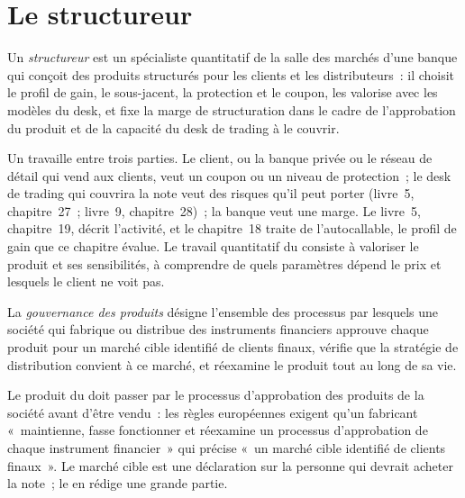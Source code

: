 \section{Le structureur}

\begin{definition}[Structureur]\label{def:in:structurer-sales-and-sales-trader:structurer}
Un \emph{structureur} est un spécialiste quantitatif de la salle des marchés d'une banque qui conçoit des produits structurés pour les clients
et les distributeurs~: il choisit le profil de gain, le sous-jacent, la protection et le coupon, les valorise avec les modèles du desk,
et fixe la marge de structuration dans le cadre de l'approbation du produit et de la capacité du desk de trading à le couvrir.
\end{definition}

Un  travaille entre trois parties. Le client, ou la banque privée ou le réseau de détail qui vend aux clients, veut
un coupon ou un niveau de protection~; le desk de trading qui couvrira la note veut des risques qu'il peut porter (livre~5, chapitre~27~;
livre~9, chapitre~28)~; la banque veut une marge. Le livre~5, chapitre~19, décrit l'activité, et le chapitre~18 traite de
l'autocallable, le profil de gain que ce chapitre évalue. Le travail quantitatif du  consiste à valoriser le produit et
ses sensibilités, à comprendre de quels paramètres dépend le prix et lesquels le client ne voit pas.

\begin{definition}\label{def:in:structurer-sales-and-sales-trader:governance}
La \emph{gouvernance des produits} désigne l'ensemble des processus par lesquels une société qui fabrique ou
distribue des instruments financiers approuve chaque produit pour un marché cible identifié de clients finaux, vérifie que la
stratégie de distribution convient à ce marché, et réexamine le produit tout au long de sa vie.
\end{definition}

Le produit du  doit passer par le processus d'approbation des produits de la société avant d'être vendu~: les règles européennes exigent qu'un
fabricant «~maintienne, fasse fonctionner et réexamine un processus d'approbation de chaque instrument financier~» qui précise
«~un marché cible identifié de clients finaux~». Le marché cible est une déclaration sur la personne qui devrait acheter la note~; le
 en rédige une grande partie.

